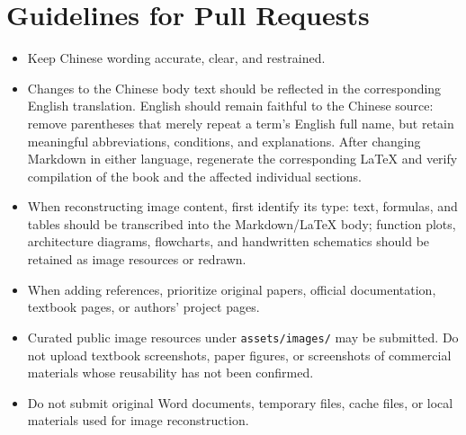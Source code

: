\hypertarget{guidelines-for-pull-requests}{%
\section{Guidelines for Pull Requests}\label{guidelines-for-pull-requests}}

\begin{itemize}
\tightlist
\item
  Keep Chinese wording accurate, clear, and restrained.
\item
  Changes to the Chinese body text should be reflected in the corresponding English translation. English should remain faithful to the Chinese source: remove parentheses that merely repeat a term's English full name, but retain meaningful abbreviations, conditions, and explanations. After changing Markdown in either language, regenerate the corresponding LaTeX and verify compilation of the book and the affected individual sections.
\item
  When reconstructing image content, first identify its type: text, formulas, and tables should be transcribed into the Markdown/LaTeX body; function plots, architecture diagrams, flowcharts, and handwritten schematics should be retained as image resources or redrawn.
\item
  When adding references, prioritize original papers, official documentation, textbook pages, or authors' project pages.
\item
  Curated public image resources under \texttt{assets/images/} may be submitted. Do not upload textbook screenshots, paper figures, or screenshots of commercial materials whose reusability has not been confirmed.
\item
  Do not submit original Word documents, temporary files, cache files, or local materials used for image reconstruction.
\end{itemize}

\clearpage
